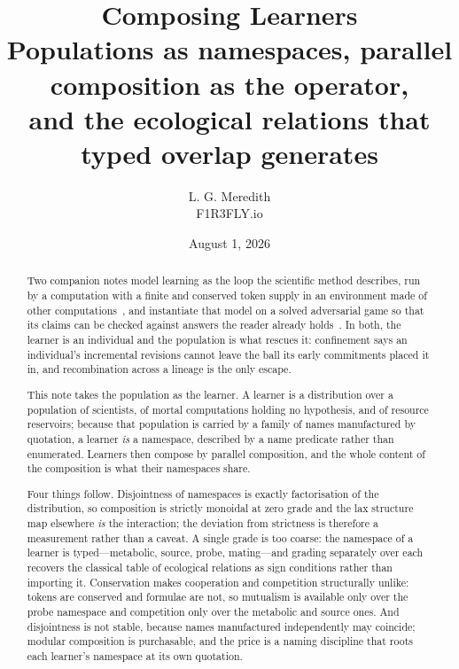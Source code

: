 \documentclass[11pt,a4paper]{article}
\title{\textbf{Composing Learners}\\[0.4em]
\large Populations as namespaces, parallel composition as the operator,\\
and the ecological relations that typed overlap generates}
\author{L. G. Meredith\\ \small F1R3FLY.io}
\date{August 1, 2026}
\theoremstyle{plain}
\theoremstyle{definition}
\theoremstyle{remark}
\begin{document}
\maketitle

\begin{abstract}
Two companion notes model learning as the loop the scientific method describes, run by a
computation with a finite and conserved token supply in an environment made of other
computations~\cite{scientist}, and instantiate that model on a solved adversarial game so that
its claims can be checked against answers the reader already holds~\cite{game}. In both, the
learner is an individual and the population is what rescues it: confinement says an individual's
incremental revisions cannot leave the ball its early commitments placed it in, and recombination
across a lineage is the only escape.

This note takes the population as the learner. A learner is a distribution over a population of
scientists, of mortal computations holding no hypothesis, and of resource reservoirs; because
that population is carried by a family of names manufactured by quotation, a learner
\emph{is} a namespace, described by a name predicate rather than enumerated. Learners then
compose by parallel composition, and the whole content of the composition is what their
namespaces share.

Four things follow. Disjointness of namespaces is exactly factorisation of the distribution, so
composition is strictly monoidal at zero grade and the lax structure map elsewhere \emph{is} the
interaction; the deviation from strictness is therefore a measurement rather than a caveat. A
single grade is too coarse: the namespace of a learner is typed---metabolic, source, probe,
mating---and grading separately over each recovers the classical table of ecological relations as
sign conditions rather than importing it. Conservation makes cooperation and competition
structurally unlike: tokens are conserved and formulae are not, so mutualism is available only
over the probe namespace and competition only over the metabolic and source ones. And
disjointness is not stable, because names manufactured independently may coincide; modular
composition is purchasable, and the price is a naming discipline that roots each learner's
namespace at its own quotation.


\end{abstract}
\end{document}
